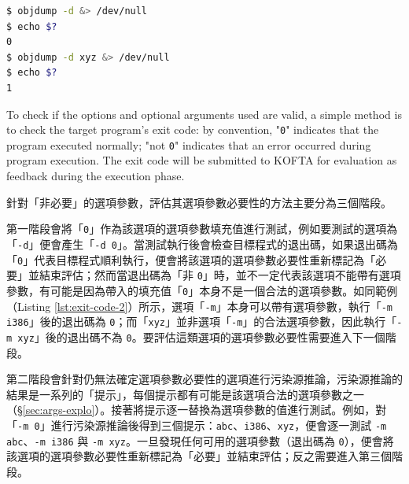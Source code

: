 \begin{lstlisting}[float=h!, language=sh, caption=程式退出碼範例一, label=lst:exit-code-1]
$ objdump -d &> /dev/null 
$ echo $?                                
0
$ objdump -d xyz &> /dev/null
$ echo $?                                    
1
\end{lstlisting}
\fi

To check if the options and optional arguments used are valid, a simple method is to check the target program's exit code: by convention, "\texttt{0}" indicates that the program executed normally; "not \texttt{0}" indicates that an error occurred during program execution. The exit code will be submitted to KOFTA for evaluation as feedback during the execution phase.

\iffalse
針對「非必要」的選項參數，評估其選項參數必要性的方法主要分為三個階段。

第一階段會將「\texttt{0}」作為該選項的選項參數填充值進行測試，例如要測試的選項為「\texttt{-d}」便會產生「\texttt{-d 0}」。當測試執行後會檢查目標程式的退出碼，如果退出碼為「\texttt{0}」代表目標程式順利執行，便會將該選項的選項參數必要性重新標記為「必要」並結束評估；然而當退出碼為「非 \texttt{0}」時，並不一定代表該選項不能帶有選項參數，有可能是因為帶入的填充值「\texttt{0}」本身不是一個合法的選項參數。如同範例（Listing \ref{lst:exit-code-2}）所示，選項「\texttt{-m}」本身可以帶有選項參數，執行「\texttt{-m i386}」後的退出碼為 \texttt{0}；而「\texttt{xyz}」並非選項「\texttt{-m}」的合法選項參數，因此執行「\texttt{-m xyz}」後的退出碼不為 \texttt{0}。要評估這類選項的選項參數必要性需要進入下一個階段。

第二階段會針對仍無法確定選項參數必要性的選項進行污染源推論，污染源推論的結果是一系列的「提示」，每個提示都有可能是該選項合法的選項參數之一（\S \ref{sec:args-explo}）。接著將提示逐一替換為選項參數的值進行測試。例如，對「\texttt{-m 0}」進行污染源推論後得到三個提示：\texttt{abc}、\texttt{i386}、\texttt{xyz}，便會逐一測試 \texttt{-m abc}、\texttt{-m i386} 與 \texttt{-m xyz}。一旦發現任何可用的選項參數（退出碼為 \texttt{0}），便會將該選項的選項參數必要性重新標記為「必要」並結束評估；反之需要進入第三個階段。

